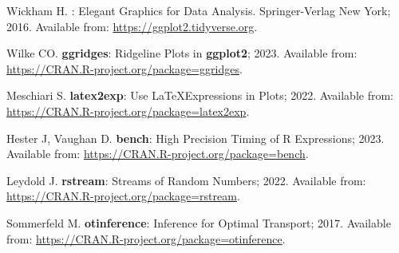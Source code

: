 \documentclass[10pt,letterpaper]{article}
\newcommand{\pkg}[1]{{\bf #1}}
\begin{document}
\begin{thebibliography}{10}
Wickham H.
\newblock \pkg{ggplot2}: {E}legant Graphics for Data Analysis.
\newblock Springer-Verlag New York; 2016.
\newblock Available from: \url{https://ggplot2.tidyverse.org}.

Wilke CO. \pkg{ggridges}: {R}idgeline Plots in \pkg{ggplot2}; 2023.
\newblock Available from: \url{https://CRAN.R-project.org/package=ggridges}.

Meschiari S. \pkg{latex2exp}: {U}se \LaTeX Expressions in Plots; 2022.
\newblock Available from: \url{https://CRAN.R-project.org/package=latex2exp}.

Hester J, Vaughan D. \pkg{bench}: {H}igh Precision Timing of R Expressions; 2023.
\newblock Available from: \url{https://CRAN.R-project.org/package=bench}.

Leydold J. \pkg{rstream}: {S}treams of Random Numbers; 2022.
\newblock Available from: \url{https://CRAN.R-project.org/package=rstream}.

Sommerfeld M. \pkg{otinference}: {I}nference for Optimal Transport; 2017.
\newblock Available from: \url{https://CRAN.R-project.org/package=otinference}.

\end{thebibliography}
\end{document}

